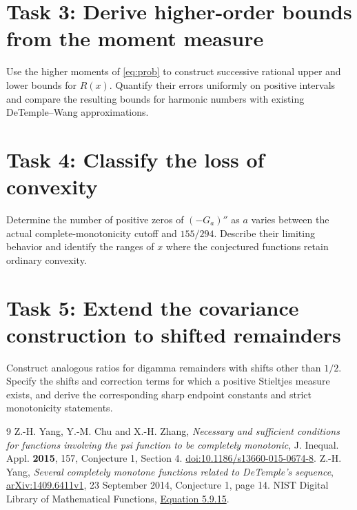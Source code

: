 \documentclass[11pt]{article}
\begin{document}
\section*{Task 3: Derive higher-order bounds from the moment measure}
Use the higher moments of \eqref{eq:prob} to construct successive
rational upper and lower bounds for $R(x)$. Quantify their errors
uniformly on positive intervals and compare the resulting bounds for
harmonic numbers with existing DeTemple--Wang approximations.

\section*{Task 4: Classify the loss of convexity}
Determine the number of positive zeros of $(-G_a)''$ as $a$ varies
between the actual complete-monotonicity cutoff and $155/294$.
Describe their limiting behavior and identify the ranges of $x$ where
the conjectured functions retain ordinary convexity.

\section*{Task 5: Extend the covariance construction to shifted remainders}
Construct analogous ratios for digamma remainders with shifts other
than $1/2$. Specify the shifts and correction terms for which a positive
Stieltjes measure exists, and derive the corresponding sharp endpoint
constants and strict monotonicity statements.

\begin{thebibliography}{9}
 Z.-H. Yang, Y.-M. Chu and X.-H. Zhang,
\emph{Necessary and sufficient conditions for functions involving the psi
function to be completely monotonic}, J. Inequal. Appl. \textbf{2015},
157, Conjecture 1, Section 4.
\href{https://doi.org/10.1186/s13660-015-0674-8}{doi:10.1186/s13660-015-0674-8}.
 Z.-H. Yang,
\emph{Several completely monotone functions related to DeTemple's sequence},
\href{https://arxiv.org/abs/1409.6411}{arXiv:1409.6411v1},
23 September 2014, Conjecture 1, page 14.
 NIST Digital Library of Mathematical Functions,
\href{https://dlmf.nist.gov/5.9.E15}{Equation 5.9.15}.
\end{thebibliography}
\end{document}

